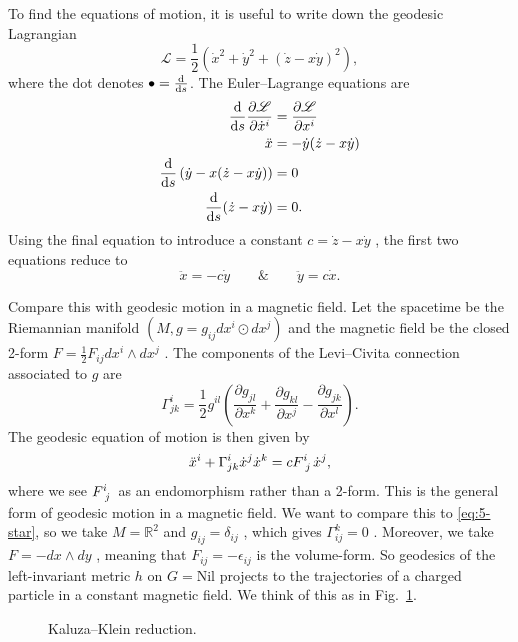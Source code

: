 To find the equations of motion, it is useful to write down the geodesic Lagrangian 
\begin{equation}
  \mathscr{L} = \frac{1}{2}( \dot{x}^2 + \dot{y}^2 + (\dot{z} - x \dot{y})^2),
\end{equation}
where the dot denotes $\bullet = \dv{s}$.
The Euler--Lagrange equations are
\begin{align}
  \dv{s} \frac{\partial \mathscr{L}}{\partial \dot{x}^{i}} &= \frac{\partial \mathscr{L}}{\partial x^{i}} \\
  \ddot x &= - \dot{y} (\dot{z} - x \dot{y}) \\
  \dv{s} \left( \dot{y} - x (\dot{z} - x \dot{y}) \right) &= 0 \\
  \dv{s}(\dot{z} - x \dot{y}) &= 0.
\end{align}
Using the final equation to introduce a constant $c = \dot{z} - x \dot{y}$ , the first two equations reduce to
\begin{equation}
  \label{eq:5-star}
  \ddot x =  - c \dot y \qquad \& \qquad
  \ddot y = c \dot x.
\end{equation}

Compare this with geodesic motion in a magnetic field.
Let the spacetime be the Riemannian manifold $(M, g = g_{ij} dx^{i} \odot dx^{j})$  and the magnetic field be the closed 2-form $F = \frac{1}{2} F_{ij} dx^{i} \wedge dx^{j}$ .
The components of the Levi--Civita connection associated to $g$ are
\begin{equation}
  \Gamma^{i}_{jk} = \frac{1}{2} g^{il} \left( \frac{\partial g_{jl}}{\partial x^{k}} + \frac{\partial g_{kl}}{\partial x^{j}} - \frac{\partial g_{jk}}{\partial x^{l}} \right).
\end{equation}
The geodesic equation of motion is then given by
\begin{equation}
  \ddot x^{i} + \Gamma^{i}_{jk} \dot{x}^{j} \dot{x}^{k} = c F\indices{^{i}_{j}} \dot{x}^{j},
\end{equation}
where we see $F\indices{^{i}_{j}}$  as an endomorphism rather than a 2-form.
This is the general form of geodesic motion in a magnetic field.
We want to compare this to \eqref{eq:5-star}, so we take $M = \mathbb{R}^2$ and $g_{ij} = \delta_{ij}$ , which gives $\Gamma_{ij}^{k} = 0$ .
Moreover, we take $F = -dx \wedge dy$ , meaning that $F_{ij} = - \epsilon_{ij}$  is the volume-form.
So geodesics of the left-invariant metric $h$ on $G = \text{Nil}$  projects to the trajectories of a charged particle in a constant magnetic field.
We think of this as in Fig.~\ref{fig:l5f1}.
\begin{figure}[tbhp]
  \centering
  \def\svgwidth{0.6\columnwidth}
  
  \caption{Kaluza--Klein reduction.}
  \label{fig:l5f1}
\end{figure}

